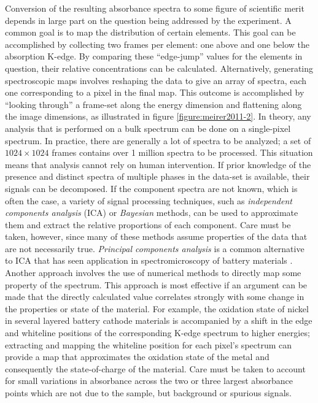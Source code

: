 \documentclass[journal=cmatex,manuscript=perspective]{achemso}
\begin{document}
Conversion of the resulting absorbance spectra to some figure of
scientific merit depends in large part on the question being addressed
by the experiment. A common goal is to map the distribution of certain
elements. This goal can be accomplished by collecting two frames per
element: one above and one below the absorption K-edge. By comparing
these ``edge-jump'' values for the elements in question, their
relative concentrations can be
calculated\cite{shieh2006}. Alternatively, generating spectroscopic
maps involves reshaping the data to give an array of spectra, each one
corresponding to a pixel in the final map. This outcome is
accomplished by ``looking through'' a frame-set along the energy
dimension and flattening along the image dimensions, as illustrated in
figure \ref{figure:meirer2011-2}. In theory, any analysis that is
performed on a bulk spectrum can be done on a single-pixel
spectrum. In practice, there are generally a lot of spectra to be
analyzed; a set of $1024\times1024$ frames contains over 1 million
spectra to be processed. This situation means that analysis cannot
rely on human intervention. If prior knowledge of the presence and
distinct spectra of multiple phases in the data-set is available,
their signals can be
decomposed\cite{wang2016,yu2015-2,shapiro2014}. If the component
spectra are not known, which is often the case, a variety of signal
processing techniques, such as \emph{independent components analysis}
(ICA)\cite{shlens2014} or \emph{Bayesian} methods\cite{knuth2005}, can
be used to approximate them and extract the relative proportions of
each component\cite{bioucas2012,duarte2014}. Care must be taken,
however, since many of these methods assume properties of the data
that are not necessarily true. \emph{Principal components analysis} is
a common alternative to ICA that has seen application in
spectromicroscopy of battery materials
\cite{shapiro2014,boesenberg2013}. Another approach involves the use
of numerical methods to directly map some property of the
spectrum. This approach is most effective if an argument can be made
that the directly calculated value correlates strongly with some
change in the properties or state of the material. For example, the
oxidation state of nickel in several layered battery cathode materials
is accompanied by a shift in the edge and whiteline positions of the
corresponding K-edge spectrum to higher energies\cite{deb2006};
extracting and mapping the whiteline position for each pixel's
spectrum can provide a map that approximates the oxidation state of
the metal and consequently the state-of-charge of the material. Care
must be taken to account for small variations in absorbance across the
two or three largest absorbance points which are not due to the
sample, but background or spurious signals.
\end{document}
